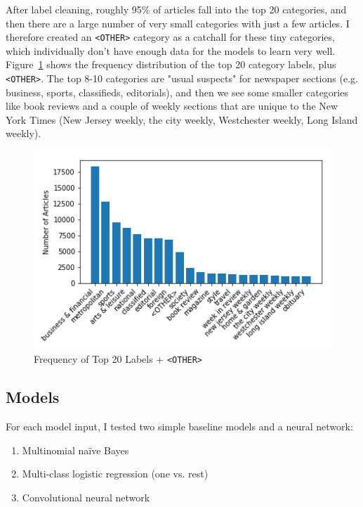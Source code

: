 \documentclass[11pt,a4paper,table]{article}
\begin{document}
After label cleaning, roughly 95\% of articles fall into the top 20 categories, and then there are a large number of very small categories with just a few articles. I therefore created an \texttt{<OTHER>} category as a catchall for these tiny categories, which individually don't have enough data for the models to learn very well. Figure~\ref{fig:topnhist} shows the frequency distribution of the top 20 category labels, plus \texttt{<OTHER>}. The top 8-10 categories are "usual suspects" for newspaper sections (e.g. business, sports, classifieds, editorials), and then we see some smaller categories like book reviews and a couple of weekly sections that are unique to the New York Times (New Jersey weekly, the city weekly, Westchester weekly, Long Island weekly).

\begin{figure}
\centering
\includegraphics[scale=0.55]{top_n_labels_histogram}
\caption{Frequency of Top 20 Labels + \small{\tt <OTHER>}}
\label{fig:topnhist}
\end{figure}

\subsection{Models}
\label{sec:models}


For each model input, I tested two simple baseline models and a neural network:

\begin{enumerate}
\item Multinomial na\"{i}ve Bayes
\item Multi-class logistic regression (one vs. rest)
\item Convolutional neural network
\end{enumerate}
\end{document}
